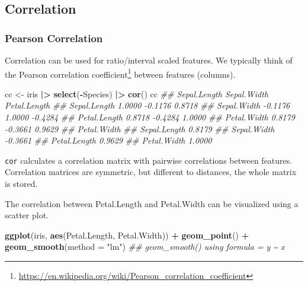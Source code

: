 \documentclass[
  notitlepage]{book}
\newenvironment{Shaded}{\begin{snugshade}}{\end{snugshade}}
\newcommand{\CommentTok}[1]{\textcolor[rgb]{0.56,0.35,0.01}{\textit{#1}}}
\newcommand{\DataTypeTok}[1]{\textcolor[rgb]{0.13,0.29,0.53}{#1}}
\newcommand{\ErrorTok}[1]{\textcolor[rgb]{0.64,0.00,0.00}{\textbf{#1}}}
\newcommand{\KeywordTok}[1]{\textcolor[rgb]{0.13,0.29,0.53}{\textbf{#1}}}
\newcommand{\NormalTok}[1]{#1}
\newcommand{\OperatorTok}[1]{\textcolor[rgb]{0.81,0.36,0.00}{\textbf{#1}}}
\newcommand{\StringTok}[1]{\textcolor[rgb]{0.31,0.60,0.02}{#1}}
\DeclareRobustCommand{\href}[2]{#2\footnote{\url{#1}}}
\begin{document}
\hypertarget{correlation}{%
\subsection{Correlation}\label{correlation}}

\hypertarget{pearson-correlation}{%
\subsubsection{Pearson Correlation}\label{pearson-correlation}}

Correlation can be used for ratio/interval scaled features. We typically
think of the \href{https://en.wikipedia.org/wiki/Pearson_correlation_coefficient}{Pearson correlation
coefficient}
between features (columns).

\begin{Shaded}
\begin{Highlighting}[]
\NormalTok{cc \textless{}{-}}\StringTok{ }\NormalTok{iris }\OperatorTok{|}\ErrorTok{\textgreater{}}\StringTok{ }
\StringTok{  }\KeywordTok{select}\NormalTok{(}\OperatorTok{{-}}\NormalTok{Species) }\OperatorTok{|}\ErrorTok{\textgreater{}}\StringTok{ }
\StringTok{  }\KeywordTok{cor}\NormalTok{()}
\NormalTok{cc}
\CommentTok{\#\#              Sepal.Length Sepal.Width Petal.Length}
\CommentTok{\#\# Sepal.Length       1.0000     {-}0.1176       0.8718}
\CommentTok{\#\# Sepal.Width       {-}0.1176      1.0000      {-}0.4284}
\CommentTok{\#\# Petal.Length       0.8718     {-}0.4284       1.0000}
\CommentTok{\#\# Petal.Width        0.8179     {-}0.3661       0.9629}
\CommentTok{\#\#              Petal.Width}
\CommentTok{\#\# Sepal.Length      0.8179}
\CommentTok{\#\# Sepal.Width      {-}0.3661}
\CommentTok{\#\# Petal.Length      0.9629}
\CommentTok{\#\# Petal.Width       1.0000}
\end{Highlighting}
\end{Shaded}

\texttt{cor} calculates a correlation matrix with pairwise correlations between
features. Correlation matrices are symmetric, but different to
distances, the whole matrix is stored.

The correlation between Petal.Length and Petal.Width can be visualized
using a scatter plot.

\begin{Shaded}
\begin{Highlighting}[]
\KeywordTok{ggplot}\NormalTok{(iris, }\KeywordTok{aes}\NormalTok{(Petal.Length, Petal.Width)) }\OperatorTok{+}\StringTok{ }
\StringTok{  }\KeywordTok{geom\_point}\NormalTok{() }\OperatorTok{+}
\StringTok{  }\KeywordTok{geom\_smooth}\NormalTok{(}\DataTypeTok{method =} \StringTok{"lm"}\NormalTok{)}
\CommentTok{\#\# \textasciigrave{}geom\_smooth()\textasciigrave{} using formula = \textquotesingle{}y \textasciitilde{} x\textquotesingle{}}
\end{Highlighting}
\end{Shaded}
\end{document}
